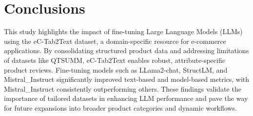 \section{Conclusions}
This study highlights the impact of fine-tuning Large Language Models (LLMs) using the eC-Tab2Text dataset, a domain-specific resource for e-commerce applications. By consolidating structured product data and addressing limitations of datasets like QTSUMM, eC-Tab2Text enables robust, attribute-specific product reviews. Fine-tuning models such as LLama2-chat, StructLM, and Mistral\_Instruct significantly improved text-based and model-based metrics, with Mistral\_Instruct consistently outperforming others. These findings validate the importance of tailored datasets in enhancing LLM performance and pave the way for future expansions into broader product categories and dynamic workflows.